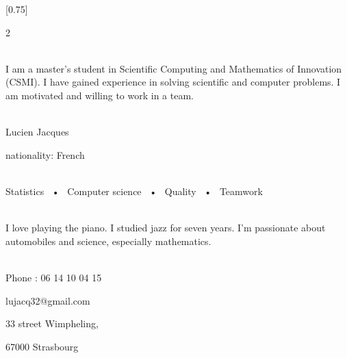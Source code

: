 \documentclass[lighthipster]{simplehipstercv}
\begin{document}
\setlength{\columnsep}{1.5cm}
[0.75]
\begin{paracol}{2}

\paracolbackgroundoptions



\footnotesize
{\setasidefontcolour
\flushright
\begin{center}
\end{center}

\\[0.5em]
I am a master's student in Scientific Computing and Mathematics of Innovation (CSMI). I have
gained experience in solving scientific and computer problems. I am motivated and willing to work in a team.
{\footnotesize
}
\bigskip



 \\[0.5em]
Lucien Jacques

nationality: French 



\bigskip

 \\[0.5em]

Statistics ~•~ Computer science ~•~ Quality ~•~ Teamwork

\bigskip




\\[0.5em]

I love playing the piano. I studied jazz for seven years. I'm passionate about automobiles and science, especially mathematics.
\bigskip



\vspace{4em}

\\[0.5em]

Phone : 06 14 10 04 15 

lujacq32@gmail.com                 

33 street Wimpheling,                  

67000 Strasbourg 


\phantom{turn the page}

}
\end{paracol}
\end{document}

